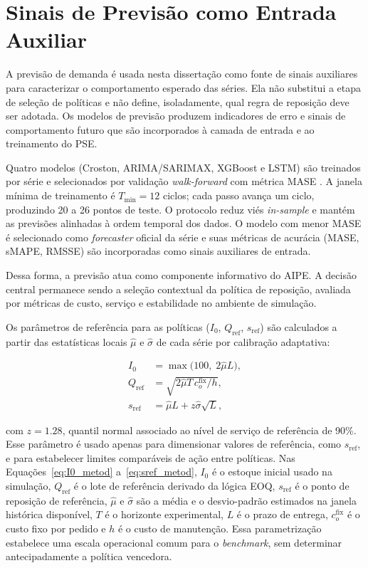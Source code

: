 \section{Sinais de Previsão como Entrada Auxiliar}
\label{sec:sinais_previsao}

A previsão de demanda é usada nesta dissertação como fonte de sinais auxiliares para caracterizar o comportamento esperado das séries. Ela não substitui a etapa de seleção de políticas e não define, isoladamente, qual regra de reposição deve ser adotada. Os modelos de previsão produzem indicadores de erro e sinais de comportamento futuro que são incorporados à camada de entrada e ao treinamento do PSE.

Quatro modelos (Croston, ARIMA/SARIMAX, XGBoost e LSTM) são treinados por série e selecionados por validação \textit{walk-forward} com métrica MASE \citep{Croston1972ForecastingIntermittentDemand}. A janela mínima de treinamento é $T_{\min} = 12$ ciclos; cada passo avança um ciclo, produzindo 20 a 26 pontos de teste. O protocolo reduz viés \textit{in-sample} e mantém as previsões alinhadas à ordem temporal dos dados. O modelo com menor MASE é selecionado como \textit{forecaster} oficial da série e suas métricas de acurácia (MASE, sMAPE, RMSSE) são incorporadas como sinais auxiliares de entrada.

Dessa forma, a previsão atua como componente informativo do AIPE. A decisão central permanece sendo a seleção contextual da política de reposição, avaliada por métricas de custo, serviço e estabilidade no ambiente de simulação.

Os parâmetros de referência para as políticas ($I_0$, $Q_{\text{ref}}$, $s_{\text{ref}}$) são calculados a partir das estatísticas locais $\hat{\mu}$ e $\hat{\sigma}$ de cada série por calibração adaptativa:

\begin{align}
  I_0 &= \max\!\bigl(100,\; 2\hat{\mu} L\bigr), \label{eq:I0_metod}\\
  Q_{\text{ref}} &= \sqrt{2\hat{\mu} T\, c_o^{\text{fix}} / h}, \label{eq:qref_metod}\\
  s_{\text{ref}} &= \hat{\mu} L + z\hat{\sigma}\sqrt{L}, \label{eq:sref_metod}
\end{align}

com $z = 1.28$, quantil normal associado ao nível de serviço de referência de 90\%. Esse parâmetro é usado apenas para dimensionar valores de referência, como $s_{\text{ref}}$, e para estabelecer limites comparáveis de ação entre políticas. Nas Equações~\ref{eq:I0_metod} a~\ref{eq:sref_metod}, $I_0$ é o estoque inicial usado na simulação, $Q_{\text{ref}}$ é o lote de referência derivado da lógica EOQ, $s_{\text{ref}}$ é o ponto de reposição de referência, $\hat{\mu}$ e $\hat{\sigma}$ são a média e o desvio-padrão estimados na janela histórica disponível, $T$ é o horizonte experimental, $L$ é o prazo de entrega, $c_o^{\text{fix}}$ é o custo fixo por pedido e $h$ é o custo de manutenção. Essa parametrização estabelece uma escala operacional comum para o \textit{benchmark}, sem determinar antecipadamente a política vencedora.

